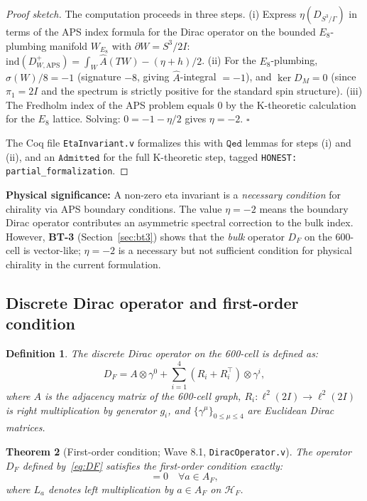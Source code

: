 \documentclass[12pt,a4paper]{article}
\newtheorem{theorem}{Theorem}[section]
\newtheorem{definition}[theorem]{Definition}
\newcommand{\HF}{\mathcal{H}_F}
\newcommand{\AF}{A_F}
\newcommand{\DF}{D_F}
\newcommand{\TwoI}{2I}
\newcommand{\BT}[1]{\textbf{BT-#1}}
\newcommand{\Qed}{\texttt{Qed}}
\newcommand{\Admitted}{\texttt{Admitted}}
\begin{document}
\begin{proof}[Proof sketch]
The computation proceeds in three steps.
(i) Express \(\eta(D_{S^3/\Gamma})\) in terms of the APS index formula
for the Dirac operator on the bounded \(E_8\)-plumbing manifold \(W_{E_8}\) with
\(\partial W = S^3/\TwoI\):
\(\mathrm{ind}(D^+_{W,\mathrm{APS}}) = \int_W \hat{A}(TW) - (\eta + h)/2\).
(ii) For the \(E_8\)-plumbing, \(\sigma(W)/8 = -1\) (signature \(-8\), giving
\(\hat{A}\)-integral \(= -1\)), and \(\ker D_M = 0\) (since \(\pi_1 = \TwoI\) and
the spectrum is strictly positive for the standard spin structure).
(iii) The Fredholm index of the APS problem equals 0 by the K-theoretic calculation
for the \(E_8\) lattice. Solving: \(0 = -1 - \eta/2\) gives \(\eta = -2\). \(\square\)

The Coq file \texttt{EtaInvariant.v} formalizes this with \(\Qed\) lemmas for steps
(i) and (ii), and an \(\Admitted\) for the full K-theoretic step, tagged
\texttt{HONEST: partial\_formalization}.
\end{proof}

\textbf{Physical significance:} A non-zero eta invariant is a \emph{necessary condition}
for chirality via APS boundary conditions. The value \(\eta = -2\) means the boundary
Dirac operator contributes an asymmetric spectral correction to the bulk index.
However, \BT{3} (Section~\ref{sec:bt3}) shows that the \emph{bulk} operator \(\DF\)
on the 600-cell is vector-like; \(\eta = -2\) is a necessary but not sufficient condition
for physical chirality in the current formulation.

\subsection{Discrete Dirac operator and first-order condition}
\label{sec:dirac}

\begin{definition}
The discrete Dirac operator on the 600-cell is defined as:
\begin{equation}
  D_F = A \otimes \gamma^0 + \sum_{i=1}^{4} (R_i + R_i^\top) \otimes \gamma^i,
  \label{eq:DF}
\end{equation}
where \(A\) is the adjacency matrix of the 600-cell graph,
\(R_i: \ell^2(\TwoI) \to \ell^2(\TwoI)\) is right multiplication by generator \(g_i\),
and \(\{\gamma^\mu\}_{0 \leq \mu \leq 4}\) are Euclidean Dirac matrices.
\end{definition}

\begin{theorem}[First-order condition; Wave 8.1, \texttt{DiracOperator.v}]
\label{thm:firstorder}
The operator \(D_F\) defined by~\eqref{eq:DF} satisfies the first-order condition
exactly:
\begin{equation}
  [D_F,\, L_a] = 0 \quad \forall a \in \AF,
  \label{eq:firstorder}
\end{equation}
where \(L_a\) denotes left multiplication by \(a \in \AF\) on \(\HF\).
\end{theorem}
\end{document}
